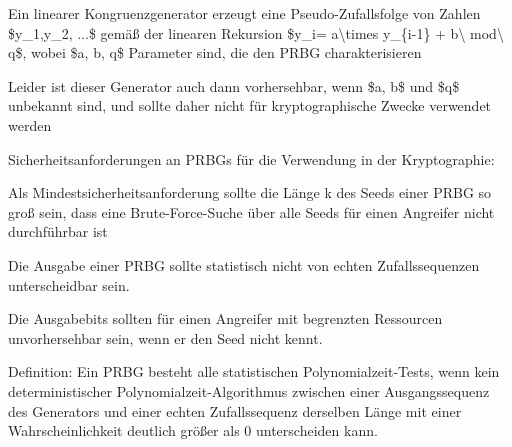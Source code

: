 \documentclass[a4paper]{article}
\begin{document}
\begin{multicols}{3}
\begin{itemize*}
            \begin{itemize*}
                  \item Ein linearer Kongruenzgenerator erzeugt eine Pseudo-Zufallsfolge von Zahlen \$y\_1,y\_2, ...\$ gemäß der linearen Rekursion \$y\_i= a\textbackslash times y\_\{i-1\} + b\textbackslash{} mod\textbackslash{} q\$, wobei \$a, b, q\$ Parameter sind, die den PRBG charakterisieren
                  \item Leider ist dieser Generator auch dann vorhersehbar, wenn \$a, b\$ und \$q\$ unbekannt sind, und sollte daher nicht für kryptographische Zwecke verwendet werden
            \end{itemize*}
            \item
            Sicherheitsanforderungen an PRBGs für die Verwendung in der
            Kryptographie:

            \begin{itemize*}
                  \item Als Mindestsicherheitsanforderung sollte die Länge k des Seeds einer PRBG so groß sein, dass eine Brute-Force-Suche über alle Seeds für einen Angreifer nicht durchführbar ist
                  \item Die Ausgabe einer PRBG sollte statistisch nicht von echten Zufallssequenzen unterscheidbar sein.
                  \item Die Ausgabebits sollten für einen Angreifer mit begrenzten Ressourcen unvorhersehbar sein, wenn er den Seed nicht kennt.
            \end{itemize*}
            \item
            Definition: Ein PRBG besteht alle statistischen Polynomialzeit-Tests,
            wenn kein deterministischer Polynomialzeit-Algorithmus zwischen einer
            Ausgangssequenz des Generators und einer echten Zufallssequenz
            derselben Länge mit einer Wahrscheinlichkeit deutlich größer als 0
            unterscheiden kann.


\end{itemize*}
\end{multicols}
\end{document}

